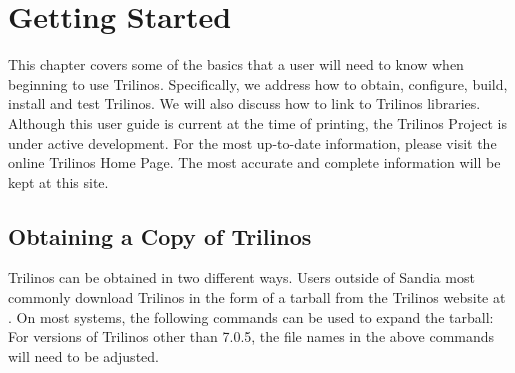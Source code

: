 \documentclass[12pt,relax]{TrilinosUserGuide}
\begin{document}
\section{Getting Started}
\label{Section:GettingStarted}
\begin{minipage}[c]{\textwidth}
\begin{minipage}[l]{.4\textwidth}

This chapter covers some of the basics that a user will need to know when 
beginning to use Trilinos.  Specifically, we address how to obtain, 
configure, build, install and test Trilinos.  We will also discuss how to
link to Trilinos libraries.
Although this user guide is current at the time of printing, the 
Trilinos Project is under active development.  For the most up-to-date information, 
please visit the online Trilinos Home Page.  The most accurate and complete information
will be kept at this site.
\end{minipage}\hfill
{}
\end{minipage}

\subsection{Obtaining a Copy of Trilinos}

Trilinos can be obtained in two different ways.  Users outside of Sandia
most commonly 
download Trilinos in the form of a tarball from the Trilinos website at 
\newline {}.
On most systems, the following commands can be used to expand the tarball:
For versions of Trilinos other than 7.0.5, the file names in the above
commands will need to be adjusted.
\end{document}
